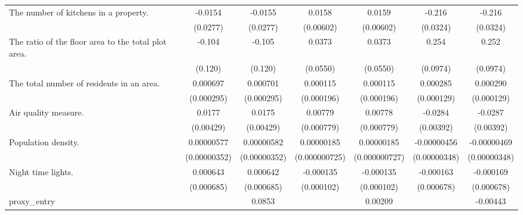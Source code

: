 {\begin{tabular}{l*{6}{c}}
The number of kitchens in a property.&     -0.0154         &     -0.0155         &      0.0158\sym{***}&      0.0159\sym{***}&      -0.216\sym{***}&      -0.216\sym{***}\\
                    &    (0.0277)         &    (0.0277)         &   (0.00602)         &   (0.00602)         &    (0.0324)         &    (0.0324)         \\
\addlinespace
The ratio of the floor area to the total plot area.&      -0.104         &      -0.105         &      0.0373         &      0.0373         &       0.254\sym{***}&       0.252\sym{***}\\
                    &     (0.120)         &     (0.120)         &    (0.0550)         &    (0.0550)         &    (0.0974)         &    (0.0974)         \\
\addlinespace
The total number of residents in an area.&    0.000697\sym{**} &    0.000701\sym{**} &    0.000115         &    0.000115         &    0.000285\sym{**} &    0.000290\sym{**} \\
                    &  (0.000295)         &  (0.000295)         &  (0.000196)         &  (0.000196)         &  (0.000129)         &  (0.000129)         \\
\addlinespace
Air quality measure.&      0.0177\sym{***}&      0.0175\sym{***}&     0.00779\sym{***}&     0.00778\sym{***}&     -0.0284\sym{***}&     -0.0287\sym{***}\\
                    &   (0.00429)         &   (0.00429)         &  (0.000779)         &  (0.000779)         &   (0.00392)         &   (0.00392)         \\
\addlinespace
Population density. &  0.00000577         &  0.00000582\sym{*}  &  0.00000185\sym{**} &  0.00000185\sym{**} & -0.00000456         & -0.00000469         \\
                    &(0.00000352)         &(0.00000352)         &(0.000000725)         &(0.000000727)         &(0.00000348)         &(0.00000348)         \\
\addlinespace
Night time lights.  &    0.000643         &    0.000642         &   -0.000135         &   -0.000135         &   -0.000163         &   -0.000169         \\
                    &  (0.000685)         &  (0.000685)         &  (0.000102)         &  (0.000102)         &  (0.000678)         &  (0.000678)         \\
\addlinespace
proxy\_entry         &                     &      0.0853\sym{***}&                     &     0.00209         &                     &    -0.00443         \\

\end{tabular}}
